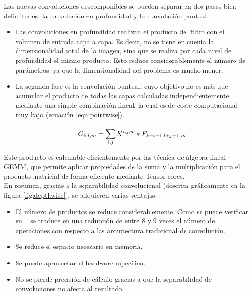 Las nuevas convoluciones descomponibles se pueden separar en dos pasos bien delimitados: la convolución en profundidad y la convolución puntual.

\begin{itemize}
    \item Las convoluciones en profundidad realizan el producto del filtro con el volumen de entrada capa a capa. Es decir, no se tiene en cuenta la dimensionalidad total de la imagen, sino que se realiza por cada nivel de profundidad el mismo producto. Esto reduce considerablemente el número de parámetros, ya que la dimensionalidad del problema es mucho menor.
    \item La segunda fase es la convolución puntual, cuyo objetivo no es más que acumular el producto de todas las capas calculadas independientemente mediante una simple combinación lineal, la cual es de coste computacional muy bajo (ecuación \ref{eqn:pointwise}).
    
      \begin{equation}\label{eqn:pointwise}
      	\centering
    G_{k,l,m} =  \sum_{i,j}^{} K^{i,j,m} * F_{k+i-1,l+j-1,m}
    \end{equation}
\end{itemize}

Este producto es calculable eficientemente por las técnica de álgebra lineal GEMM, que permite aplicar propiedades de la suma y la multiplicación para el producto matricial de forma eficiente mediante Tensor cores.\\

En resumen, gracias a la separabilidad convolucional (descrita gráficamente en la figura \ref{fig:depthwise}), se adquieren varias ventajas:
\begin{itemize}
    \item El número de productos se reduce considerablemente. Como se puede verificar en ~\cite{howard2017mobilenets} se traduce en una reducción de entre 8 y 9 veces el número de operaciones con respecto a las arquitectura tradicional de convolución.
    \item Se reduce el espacio necesario en memoria.
    \item Se puede aprovechar el hardware específico.
    \item No se pierde precisión de cálculo gracias a que la separabilidad de convoluciones no afecta al resultado.
\end{itemize}

